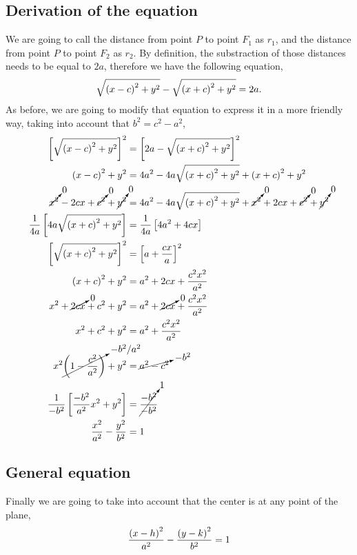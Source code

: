\documentclass[../main-notes.tex]{subfiles}
\begin{document}
\subsection{Derivation of the equation}
We are going to call the distance from point $P$ to point $F_1$ as $r_1$, and the distance from point $P$ to point $F_2$ as $r_2$.
By definition, the substraction of those distances needs to be equal to $2a$, therefore we have the following equation,
\begin{gather*}
    \sqrt{\qty(x-c)^2+y^2} - \sqrt{\qty(x+c)^2+y^2} = 2a.
\end{gather*}
As before, we are going to modify that equation to express it in a more friendly way, taking into account that $b^2=c^2-a^2$,
\begin{align*}
    \left[\sqrt{\qty(x-c)^2+y^2}\right]^2 &= \left[2a - \sqrt{\qty(x+c)^2+y^2}\right]^2 \\
    \qty(x-c)^2+y^2 &= 4a^2 - 4a\sqrt{\qty(x+c)^2+y^2} + \qty(x+c)^2+y^2 \\
    \cancelto{0}{x^2} -2cx +\cancelto{0}{c^2} +\cancelto{0}{y^2} &= 4a^2 - 4a\sqrt{\qty(x+c)^2+y^2} + \cancelto{0}{x^2} + 2cx +\cancelto{0}{c^2} +\cancelto{0}{y^2} \\
    \frac{1}{4a}\left[4a\sqrt{\qty(x+c)^2+y^2}\right] &= \frac{1}{4a}\left[4a^2+4cx\right] \\
    \left[\sqrt{\qty(x+c)^2+y^2}\right]^2 &= \left[a+\frac{cx}{a}\right]^2 \\
    \qty(x+c)^2+y^2 &= a^2 + 2cx + \frac{c^2x^2}{a^2} \\
    x^2 + \cancelto{0}{2cx} + c^2 +y^2 &= a^2 + \cancelto{0}{2cx} + \frac{c^2x^2}{a^2} \\
    x^2 + c^2 +y^2 &= a^2 + \frac{c^2x^2}{a^2} \\
    x^2\cancelto{-b^2/a^2}{\qty(1-\frac{c^2}{a^2})} +y^2 &= \cancelto{-b^2}{a^2 - c^2} \\
    \frac{1}{-b^2}\left[\frac{-b^2}{a^2}x^2 +y^2\right] &= \cancelto{1}{\frac{-b^2}{-b^2}} \\
    \frac{x^2}{a^2} - \frac{y^2}{b^2} &= 1
\end{align*}

\subsection{General equation}
Finally we are going to take into account that the center is at any point of the plane,
\begin{gather*}
    \frac{\qty(x-h)^2}{a^2} - \frac{\qty(y-k)^2}{b^2} = 1
\end{gather*}
\end{document}
